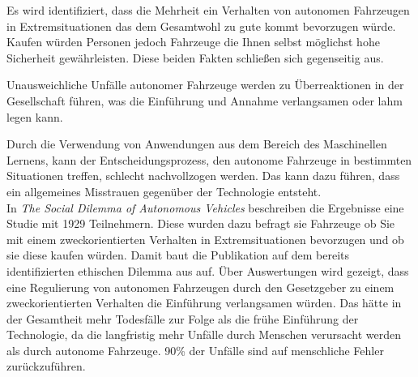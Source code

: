 Es wird identifiziert, dass die Mehrheit ein Verhalten von autonomen Fahrzeugen in Extremsituationen das dem Gesamtwohl zu gute kommt bevorzugen würde. Kaufen würden Personen jedoch Fahrzeuge die Ihnen selbst möglichst hohe Sicherheit gewährleisten. Diese beiden Fakten schließen sich gegenseitig aus.

Unausweichliche Unfälle autonomer Fahrzeuge werden zu Überreaktionen in der Gesellschaft führen, was die Einführung und Annahme verlangsamen oder lahm legen kann.

Durch die Verwendung von Anwendungen aus dem Bereich des Maschinellen Lernens, kann der Entscheidungsprozess, den autonome Fahrzeuge in bestimmten Situationen treffen, schlecht nachvollzogen werden. Das kann dazu führen, dass ein allgemeines  Misstrauen gegenüber der Technologie  entsteht.\\

In \textit{The Social Dilemma of Autonomous Vehicles} \cite{socialDilemma} beschreiben \citeauthor{socialDilemma} die Ergebnisse eine Studie mit 1929 Teilnehmern. Diese wurden dazu befragt sie Fahrzeuge ob Sie mit einem zweckorientierten Verhalten in Extremsituationen bevorzugen und ob sie diese kaufen würden. Damit baut die Publikation auf dem bereits identifizierten ethischen Dilemma aus \cite{roadblocks} auf. Über Auswertungen wird gezeigt, dass eine Regulierung von autonomen Fahrzeugen durch den Gesetzgeber zu einem zweckorientierten Verhalten die Einführung verlangsamen würden. Das hätte in der Gesamtheit mehr Todesfälle zur Folge als die frühe Einführung der Technologie, da die langfristig mehr Unfälle durch Menschen verursacht werden als durch autonome Fahrzeuge. 90\% der Unfälle sind auf menschliche Fehler zurückzuführen.\\

